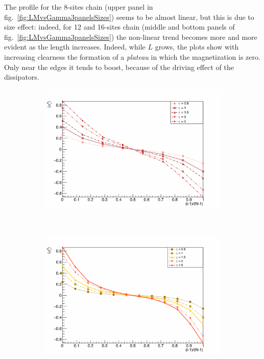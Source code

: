 The profile for the 8-sites chain (upper panel in fig.~\ref{fig:LMvsGamma3panelsSizes}) seems to be almost linear, but this is due to size effect: indeed, for 12 and 16-sites chain (middle and bottom panels of fig.~\ref{fig:LMvsGamma3panelsSizes}) the non-linear trend becomes more and more evident as the length increases. Indeed, while $L$ grows, the plots show with increasing clearness the formation of a \emph{plateau} in which the magnetization is zero. Only near the edges it tends to boost, because of the driving effect of the dissipators. 

\begin{figure}[H]
\centering
\begin{subfigure}{\columnwidth}
\centering
    \includegraphics[scale=0.6]{Figures/8sites/8sites_LMvsGamma.pdf}
    \label{fig:8sites_LMvsGamma}
\end{subfigure}\\
\begin{subfigure}{\columnwidth}
\centering
    \includegraphics[scale=0.6]{Figures/12sites/12sites_LMvsGamma.pdf}

\end{subfigure}
\end{figure}
